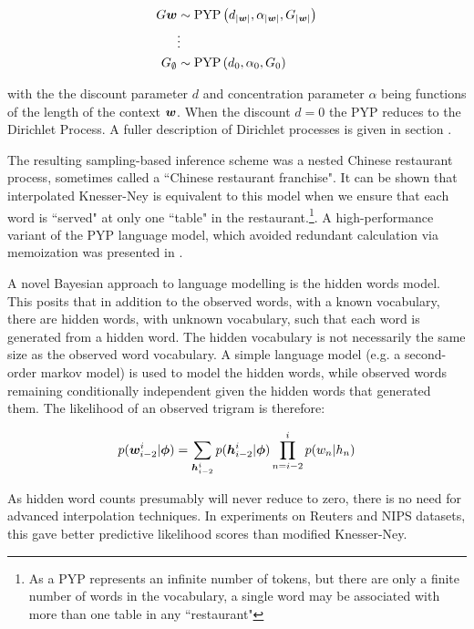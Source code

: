 \begin{align}
G\bm w & \sim \text{PYP}\left(d_{|\bm w|}, \alpha_{|\bm w|}, G_{|\bm w|} \right) \\
& \vdots \\
G_{\emptyset} &\sim \text{PYP}\left(d_0, \alpha_0, G_0\right)
\end{align}

with the the discount parameter $d$ and concentration parameter $\alpha$ being functions of the length of the context $\bm w$. When the discount $d=0$ the PYP reduces to the Dirichlet Process. A fuller description of Dirichlet processes is given in section .

The resulting sampling-based inference scheme was a nested Chinese restaurant process, sometimes called a ``Chinese restaurant franchise". It can be shown that interpolated Knesser-Ney is equivalent to this model when we ensure that each word is ``served" at only one ``table" in the restaurant.\footnote{As a PYP represents an infinite number of tokens, but there are only a finite number of words in the vocabulary, a single word may be associated with more than one table in any ``restaurant"}. A high-performance variant of the PYP language model, which avoided redundant calculation via memoization was presented in \cite{Wood2011}.

A novel Bayesian approach to language modelling is the hidden words model\cite{Deschacht2012}. This posits that in addition to the observed words, with a known vocabulary, there are hidden words, with unknown vocabulary, such that each word is generated from a hidden word. The hidden vocabulary is not necessarily the same size as the observed word vocabulary. A simple language model (e.g. a second-order markov model) is used to model the hidden words, while observed words remaining conditionally independent given the hidden words that generated them. The likelihood of an observed trigram is therefore:

\begin{align}
p(\bm w^i_{i-2}|\bm \phi) = \sum_{\bm h^i_{i-2}} p(\bm h^i_{i-2}|\bm \phi) \prod_{n=i-2}^i p(w_n | h_n)
\end{align}

As hidden word counts presumably will never reduce to zero, there is no need for advanced interpolation techniques. In experiments on Reuters and NIPS datasets, this gave better predictive likelihood scores than modified Knesser-Ney.



